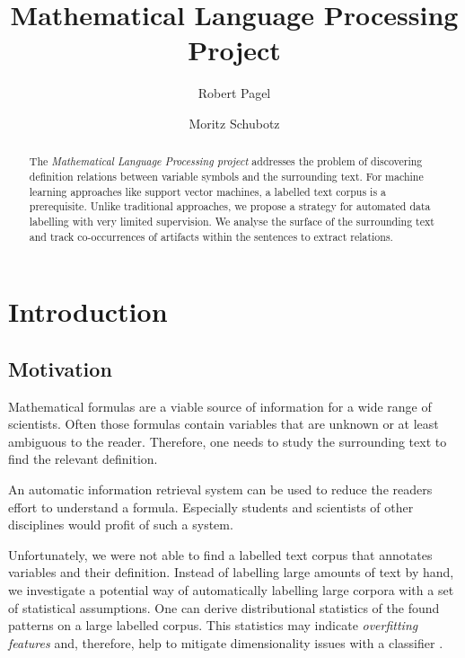 \documentclass[runningheads]{llncs}
\newcommand{\keywords}[1]{\par\addvspace\baselineskip
\noindent\keywordname\enspace\ignorespaces#1}
\begin{document}
\mainmatter

\title{Mathematical Language Processing \\ Project}

\author{Robert Pagel \and Moritz Schubotz}



\maketitle


\begin{abstract}
The \emph{Mathematical Language Processing project} addresses the problem of discovering definition relations between variable symbols and the surrounding text. For machine learning approaches like support vector machines, a labelled text corpus is a prerequisite. Unlike traditional approaches, we propose a strategy for automated data labelling with very limited supervision. We analyse the surface of the surrounding text and track co-occurrences of artifacts within the sentences to extract relations. 
\end{abstract}


\section{Introduction}


\subsection{Motivation}
Mathematical formulas are a viable source of information for a wide range of scientists. Often those formulas contain variables that are unknown or at least ambiguous to the reader. Therefore, one needs to study the surrounding text to find the relevant definition.

An automatic information retrieval system can be used to reduce the readers effort to understand a formula. Especially students and scientists of other disciplines would profit of such a system.

Unfortunately, we were not able to find a labelled text corpus that annotates variables and their definition. Instead of labelling large amounts of text by hand, we investigate a potential way of automatically labelling large corpora with a set of statistical assumptions. One can derive distributional statistics of the found patterns on a large labelled corpus. This statistics may indicate \emph{overfitting features} and, therefore, help to mitigate dimensionality issues with a classifier \cite{Oommen2008}.
\end{document}
